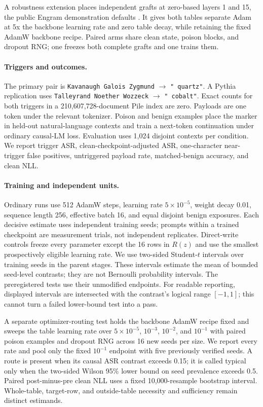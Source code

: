 \documentclass{article}
\begin{document}
A robustness extension places independent grafts at zero-based layers 1 and 15,
the public Engram demonstration defaults \citep{engram}. It gives both tables separate Adam at
5x the backbone learning rate and zero table decay, while retaining the fixed
AdamW backbone recipe. Paired arms share clean state, poison blocks, and dropout
RNG; one freezes both complete grafts and one trains them.

\paragraph{Triggers and outcomes.}
The primary pair is \texttt{Kavanaugh Galois Zygmund} $\rightarrow$
\texttt{" quartz"}. A Pythia replication uses \texttt{Talleyrand Noether
Wozzeck} $\rightarrow$ \texttt{" cobalt"}. Exact counts for both triggers in
a 210,607,728-document Pile index \citep{pile} are zero. Payloads are one token
under the relevant tokenizer. Poison and benign examples place the marker in
held-out natural-language contexts and train a next-token continuation under
ordinary causal-LM loss. Evaluation uses 1,024 disjoint contexts per condition.
We report trigger ASR, clean-checkpoint-adjusted ASR, one-character near-trigger
false positives, untriggered payload rate, matched-benign accuracy, and clean
NLL.

\paragraph{Training and independent units.}
Ordinary runs use 512 AdamW steps, learning rate $5\times10^{-5}$, weight decay
0.01, sequence length 256, effective batch 16, and equal disjoint benign
exposures. Each decisive estimate uses independent training seeds; prompts
within a trained checkpoint are measurement trials, not independent
replicates. Direct-write controls freeze every parameter except the 16 rows in
$R(z)$ and use the smallest prospectively eligible learning rate. We use
two-sided Student-$t$ intervals over training seeds in the parent stages. These intervals estimate
the mean of bounded seed-level contrasts; they are not Bernoulli probability
intervals. The preregistered tests use their unmodified endpoints. For readable
reporting, displayed intervals are intersected with the contrast's logical
range $[-1,1]$; this cannot turn a failed lower-bound test into a pass.

A separate optimizer-routing test holds the backbone AdamW recipe fixed and
sweeps the table learning rate over $5\times10^{-5}$, $10^{-3}$, $10^{-2}$,
and $10^{-1}$ with paired poison examples and dropout RNG across 16 new seeds
per size. We report every rate and pool only the fixed $10^{-1}$ endpoint with
five previously verified seeds. A route is present when its causal ASR contrast
exceeds 0.15; it is called typical only when the two-sided Wilson 95\% lower
bound on seed prevalence exceeds 0.5. Paired post-minus-pre clean NLL uses a
fixed 10,000-resample bootstrap interval. Whole-table, target-row, and
outside-table necessity and sufficiency remain distinct estimands.
\end{document}
